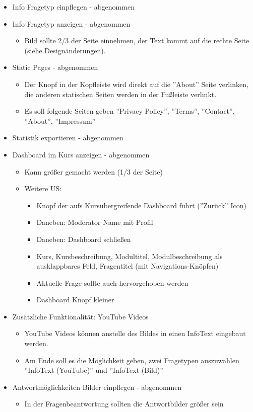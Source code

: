 \documentclass[colorback, accentcolor=tud1c, paper=a4]{tudexercise}
\begin{document}
\begin{multicols}{2}
\begin{itemize}
	\item Info Fragetyp einpflegen - abgenommen
	\item Info Fragetyp anzeigen - abgenommen
	\begin{itemize}
		\item Bild sollte 2/3 der Seite einnehmen, der Text kommt auf die rechte Seite (siehe Designänderungen). 
	\end{itemize}
	\item Static Pages - abgenommen
	\begin{itemize}
		\item Der Knopf in der Kopfleiste wird direkt auf die ''About'' Seite verlinken, die anderen statischen Seiten werden in der Fußleiste verlinkt.
		\item Es soll folgende Seiten geben ''Privacy Policy'', ''Terms'', ''Contact'', ''About'', ''Impressum''
	\end{itemize}
	\item Statistik exportieren - abgenommen
	\item Dashboard im Kurs anzeigen - abgenommen
	\begin{itemize}
		\item Kann größer gemacht werden (1/3 der Seite)
		\item Weitere US:
		\begin{itemize}
			\item Knopf der aufs Kursübergreifende Dashboard führt (''Zurück'' Icon)
			\item Daneben: Moderator Name mit Profil
			\item Daneben: Dashboard schließen
			\item Kurs, Kursbeschreibung, Modultitel, Modulbeschreibung als ausklappbares Feld, Fragentitel (mit Navigations-Knöpfen)
			\item Aktuelle Frage sollte auch hervorgehoben werden
			\item Dashboard Knopf kleiner
		\end{itemize}
	\end{itemize}
	\item Zusätzliche Funktionalität: YouTube Videos
	\begin{itemize}
		\item YouTube Videos können anstelle des Bildes in einen InfoText eingebaut werden.
		\item Am Ende soll es die Möglichkeit geben, zwei Fragetypen auszuwählen ''InfoText (YouTube)'' und ''InfoText (Bild)''
	\end{itemize}
	\item Antwortmöglichkeiten Bilder einpflegen - abgenommen
	\begin{itemize}
		\item In der Fragenbeantwortung sollten die Antwortbilder größer sein
	\end{itemize}
\end{itemize}
\end{multicols}
\end{document}
